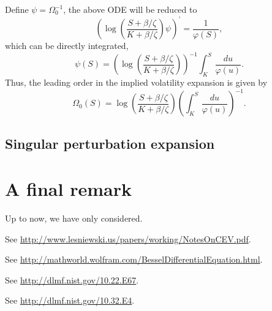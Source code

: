 \documentclass[12pt]{article}
\begin{document}
    Define $\psi=\Omega_0^{-1}$, the above ODE will be reduced to
    \begin{equation}
      \left(\log\left(\frac{S+\beta / \zeta}{K+\beta / \zeta}\right)\psi\right)^{\prime} = \frac{1}{\varphi(S)},
    \end{equation}
    which can be directly integrated,
    \begin{equation}
      \psi(S) = \left(\log\left(\frac{S+\beta / \zeta}{K+\beta / \zeta}\right)\right)^{-1}\int_K^S\frac{du}{\varphi(u)}.
    \end{equation}
    Thus, the leading order in the implied volatility expansion is given by
    \begin{equation}
      \Omega_0(S) = \log\left(\frac{S+\beta / \zeta}{K+\beta / \zeta}\right)\left(\int_K^S\frac{du}{\varphi(u)}\right)^{-1}.
    \end{equation}




  \subsection{Singular perturbation expansion}

\section{A final remark}

  Up to now, we have only considered.




\begin{thebibliography}{99}
    See \url{http://www.lesniewski.us/papers/working/NotesOnCEV.pdf}.

    See \url{http://mathworld.wolfram.com/BesselDifferentialEquation.html}.

    See \url{http://dlmf.nist.gov/10.22.E67}.

    See \url{http://dlmf.nist.gov/10.32.E4}.
\end{thebibliography}
\end{document}
